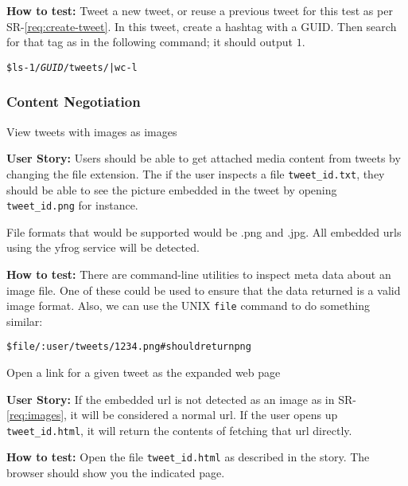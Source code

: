 \begin{Requirements}
\textbf{How to test:} Tweet a new tweet, or reuse a previous tweet for this test
as per SR-\ref{req:create-tweet}. In this tweet, create a hashtag with a GUID.
Then search for that tag as in the following command; it should output $1$.

\begin{alltt}
    \$ ls -1 \texttt{/\textit{GUID}/tweets/} | wc -l
\end{alltt}

\subsubsection{Content Negotiation}

\item View tweets with images as images\label{req:images}

\textbf{User Story:} Users should be able to get attached media content from
tweets by changing the file extension. The if the user inspects a file
\texttt{tweet\_id.txt}, they should be able to see the picture embedded in the
tweet by opening \texttt{tweet\_id.png} for instance.

File formats that would be supported would be .png and .jpg. All embedded urls
using the yfrog service will be detected.

\textbf{How to test:} There are command-line utilities to inspect meta data
about an image file. One of these could be used to ensure that the data returned
is a valid image format. Also, we can use the UNIX \texttt{file} command to do
something similar:

\begin{alltt}
    \$ file /:user/tweets/1234.png # should return png
\end{alltt}

\item Open a link for a given tweet as the expanded web page

\textbf{User Story:} If the embedded url is not detected as an image as in
SR-\ref{req:images}, it will be considered a normal url. If the user opens up
\texttt{tweet\_id.html}, it will return the contents of fetching that url
directly.

\textbf{How to test:} Open the file \texttt{tweet\_id.html} as described in the
story. The browser should show you the indicated page.

\end{Requirements}


